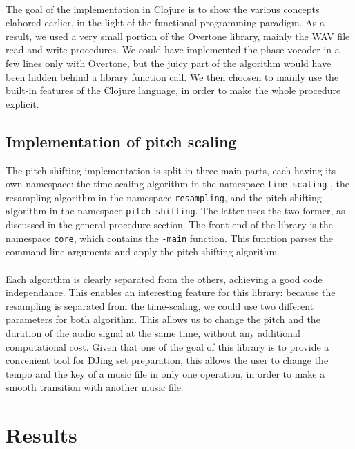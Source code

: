 \documentclass[letterpaper]{article}
\newcommand*{\codeinl}{\texttt}
\theoremstyle{definition}
\theoremstyle{remark}
\theoremstyle{plain}
\begin{document}
\paragraph{}
The goal of the implementation in Clojure is to show the various concepts
elabored earlier, in the light of the functional programming paradigm. As a
result, we used a very small portion of the Overtone library, mainly the WAV
file read and write procedures. We could have implemented the phase vocoder in a
few lines only with Overtone, but the juicy part of the algorithm would have
been hidden behind a library function call. We then choosen to mainly use the
built-in features of the Clojure language, in order to make the whole procedure
explicit.

\subsection{Implementation of pitch scaling}
The pitch-shifting implementation is split in three main parts, each having its
own namespace: the time-scaling algorithm in the namespace
\codeinl{time-scaling} , the resampling algorithm in the namespace
\codeinl{resampling}, and the pitch-shifting algorithm in the namespace
\codeinl{pitch-shifting}. The latter uses the two former, as discussed in the
general procedure section. The front-end of the library is the namespace
\codeinl{core}, which contains the \codeinl{-main} function. This function
parses the command-line arguments and apply the pitch-shifting algorithm.

\paragraph{}
Each algorithm is clearly separated from the others, achieving a good code
independance. This enables an interesting feature for this library: because the
resampling is separated from the time-scaling, we could use two different
parameters for both algorithm. This allows us to change the pitch and the
duration of the audio signal at the same time, without any additional
computational cost. Given that one of the goal of this library is to provide a
convenient tool for DJing set preparation, this allows the user to change the
tempo and the key of a music file in only one operation, in order to make a
smooth transition with another music file.

\section{Results}
\end{document}
